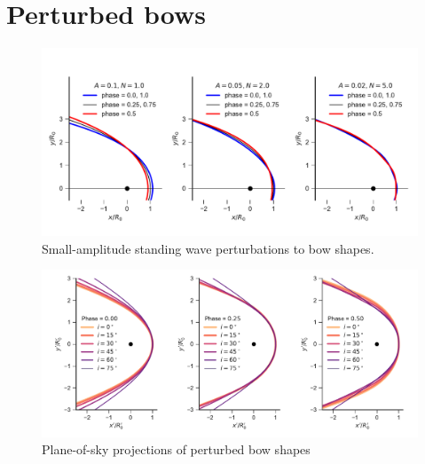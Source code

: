 \section{Perturbed bows}
\label{sec:perturbed-bows}

\begin{figure}
  \centering
  \includegraphics[width=\linewidth]{figs/compare_xyprime_wave-wilkinoid}
  \caption{Small-amplitude standing wave perturbations to bow shapes.}
  \label{fig:perturb-shapes}
\end{figure}

\begin{figure}
  \centering
  \includegraphics[width=\linewidth]
  {figs/wave_xyprime-A005-N20-ancantoid-xi080-beta000500}
  \caption{Plane-of-sky projections of perturbed bow shapes}
  \label{fig:perturb-xy-prime}
\end{figure}


